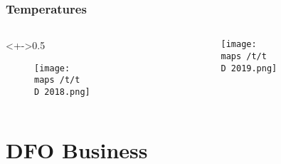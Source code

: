 \documentclass{beamer}
\begin{document}
	
	
	
	\begin{frame}
		
		\frametitle{Temperatures}
		\begin{columns}
			\begin{column}<+->{0.5\textwidth}
				\vspace*{-0.5cm}
				\begin{figure}
					\centerline{\texttt{[image: \\maps /t/t\\D 2018.png]}}
					
				\end{figure}
			\end{column}
			
			\begin{column}{0.5\textwidth}
				\begin{figure}
					\vspace*{-0.5cm}
					
					\centerline{\texttt{[image: \\maps /t/t\\D 2019.png]}}
					
				\end{figure}
				
			\end{column}
		\end{columns}
	\end{frame}
	

	
	\section{DFO Business}
	
	
\end{document}
